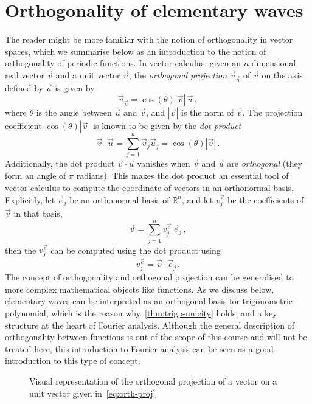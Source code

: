 \section{Orthogonality of elementary waves}
The reader might be more familiar with the notion of orthogonality in vector spaces, which
we summarise below as an introduction to the notion of orthogonality of periodic
functions. In vector calculus, given an $n$-dimensional real vector $\vec{v}$ and a unit
vector $\vec{u}$, the \emph{orthogonal projection} $\vec{v}_{\vec{u}}$ of $\vec{v}$ on the
axis defined by $\vec{u}$ is given by
\begin{equation}
  \label{eq:orth-proj}
  \vec{v}_{\vec{u}}=\cos(\theta)|\vec{v}|\,\vec{u}\,,
\end{equation}
where $\theta$ is the angle between $\vec{u}$ and $\vec{v}$, and $|\vec{v}|$ is the norm
of $\vec{v}$. The projection coefficient $\cos(\theta)|\vec{v}|$ is known to be given by
the
\emph{dot product}
\begin{equation}
  \vec{v}\cdot \vec{u}=\sum_{j=1}^n \vec{v}_j \vec{u}_j=\cos(\theta)|\vec{v}|\,.
  \label{eq:vec-dot}
\end{equation}
Additionally, the dot product $\vec{v}\cdot \vec{u}$ vanishes when $\vec{v}$ and $\vec{u}$
are \emph{orthogonal} (\ie they form an angle of $\pi$ radians). This makes the dot
product an essential tool of vector calculus to compute the coordinate of vectors in an
orthonormal basis. Explicitly, let $\vec{e}_j$ be an orthonormal basis of $\mathbb{R}^n$,
and let $v^{\vec{e}}_j$ be the coefficients of $\vec{v}$ in that basis, \ie
\begin{equation}
  \vec{v}=\sum_{j=1}^{n}v^{\vec{e}}_j\,\vec{e}_j\,,
\end{equation}
then the $v^{\vec{e}}_j$ can be computed using the dot product using
\begin{equation}
  v^{\vec{e}}_j=\vec{v}\cdot \vec{e}_j\,.\label{eq:basis-proj}
\end{equation}
The concept of orthogonality and orthogonal projection can be generalised to more complex
mathematical objects like functions. As we discuss below, elementary waves can be
interpreted as an orthogonal basis for trigonometric polynomial, which is the reason
why~\cref{thm:trigp-unicity} holds, and a key structure at the heart of Fourier analysis.
Although the general description of orthogonality between functions is out of the scope of
this course and will not be treated here, this introduction to Fourier analysis can be
seen as a good introduction to this type of concept.
\begin{figure}[t]
  \caption{Visual representation of the orthogonal projection of a vector on a unit vector
  given in~\cref{eq:orth-proj}}
  \label{fig:orth-proj}
\end{figure}

